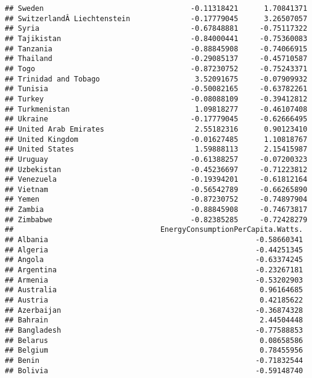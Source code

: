 \documentclass[
]{article}
\begin{document}
\begin{verbatim}
## Sweden                                  -0.11318421      1.70841371
## SwitzerlandÂ Liechtenstein              -0.17779045      3.26507057
## Syria                                   -0.67848881     -0.75117322
## Tajikistan                              -0.84000441     -0.75360083
## Tanzania                                -0.88845908     -0.74066915
## Thailand                                -0.29085137     -0.45710587
## Togo                                    -0.87230752     -0.75243371
## Trinidad and Tobago                      3.52091675     -0.07909932
## Tunisia                                 -0.50082165     -0.63782261
## Turkey                                  -0.08088109     -0.39412812
## Turkmenistan                             1.09818277     -0.46107408
## Ukraine                                 -0.17779045     -0.62666495
## United Arab Emirates                     2.55182316      0.90123410
## United Kingdom                          -0.01627485      1.10818767
## United States                            1.59888113      2.15415987
## Uruguay                                 -0.61388257     -0.07200323
## Uzbekistan                              -0.45236697     -0.71223812
## Venezuela                               -0.19394201     -0.61812164
## Vietnam                                 -0.56542789     -0.66265890
## Yemen                                   -0.87230752     -0.74897904
## Zambia                                  -0.88845908     -0.74673817
## Zimbabwe                                -0.82385285     -0.72428279
##                                  EnergyConsumptionPerCapita.Watts.
## Albania                                                -0.58660341
## Algeria                                                -0.44251345
## Angola                                                 -0.63374245
## Argentina                                              -0.23267181
## Armenia                                                -0.53202903
## Australia                                               0.96164685
## Austria                                                 0.42185622
## Azerbaijan                                             -0.36874328
## Bahrain                                                 2.44504448
## Bangladesh                                             -0.77588853
## Belarus                                                 0.08658586
## Belgium                                                 0.78455956
## Benin                                                  -0.71832544
## Bolivia                                                -0.59148740

\end{verbatim}
\end{document}
